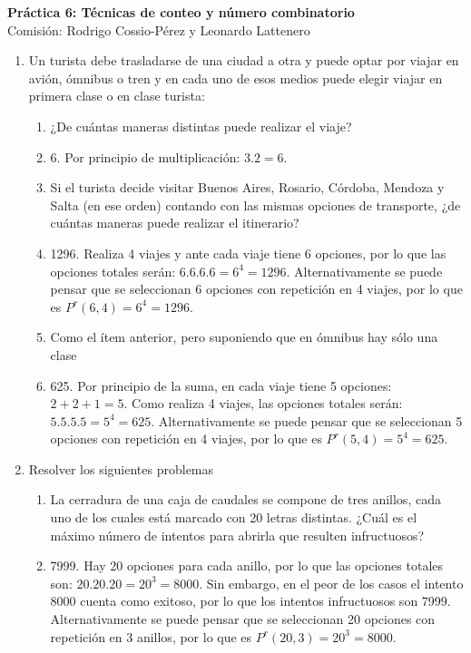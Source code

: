 \documentclass[a4paper]{article}
\newcommand{\answer}{\item[**]}
\newcommand{\exercise}{\item}
\begin{document}
\noindent \hrulefill 
\vspace{-7pt}
\begin{center} 
	\textbf{ Práctica 6: Técnicas de conteo y número combinatorio} \\
	Comisión: Rodrigo Cossio-Pérez y Leonardo Lattenero
\end{center}
\vspace{-10pt}
\hrulefill


\begin{enumerate}

	\exercise Un turista debe trasladarse de una ciudad a otra y puede optar por viajar en avión, ómnibus o tren y en cada uno de esos medios puede elegir viajar en primera clase o en clase turista:
	\begin{enumerate} [label=(\alph*)]
		\item ¿De cuántas maneras distintas puede realizar el viaje?
		\answer 6. Por principio de multiplicación: $3 . 2 = 6$. 

		\item Si el turista decide visitar Buenos Aires, Rosario, Córdoba, Mendoza y Salta (en ese orden) contando con las mismas opciones de transporte, ¿de cuántas maneras puede realizar el itinerario?
		\answer 1296. Realiza 4 viajes y ante cada viaje tiene 6 opciones, por lo que las opciones totales serán: $6.6.6.6 = 6^4 = 1296$. Alternativamente se puede pensar que se seleccionan 6 opciones con repetición en 4 viajes, por lo que es $P^r(6,4)=6^4=1296$.
		
		\item Como el ítem anterior, pero suponiendo que en ómnibus hay sólo una clase
		\answer 625. Por principio de la suma, en cada viaje tiene 5 opciones: $ 2 + 2 + 1 = 5$. Como realiza 4 viajes, las opciones totales serán: $5.5.5.5 = 5^4 = 625$.  Alternativamente se puede pensar que se seleccionan 5 opciones con repetición en 4 viajes, por lo que es $P^r(5,4)=5^4=625$.
	\end{enumerate}

	\exercise Resolver los siguientes problemas %
	\begin{enumerate} [label=(\alph*)]
		\item La cerradura de una caja de caudales se compone de tres anillos, cada uno de los cuales está marcado con 20 letras distintas. ¿Cuál es el máximo número de intentos para abrirla que resulten infructuosos?
		\answer 7999. Hay 20 opciones para cada anillo, por lo que las opciones totales son: $20.20.20 = 20^3 = 8000$. Sin embargo, en el peor de los casos el intento 8000 cuenta como exitoso, por lo que los intentos infructuosos son 7999. Alternativamente se puede pensar que se seleccionan 20 opciones con repetición en 3 anillos, por lo que es $P^r(20,3)=20^3=8000$. 


\end{enumerate}
\end{enumerate}
\end{document}
